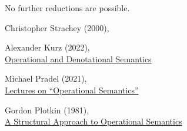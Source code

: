 \documentclass{article}
\begin{document}
No further reductions are possible.
\plush{}


Christopher Strachey (2000),\\

Alexander Kurz (2022),\\
\href{https://hackmd.io/@alexhkurz/Hkf6BTL6P}{Operational and Denotational Semantics}

Michael Pradel (2021),\\
\href{https://www.youtube.com/watch?v=jsBHd3-04oA}{Lectures on ``Operational Semantics''}

Gordon Plotkin (1981),\\
\href{https://web.eecs.umich.edu/~weimerw/2006-615/reading/plotkin81structural.pdf}{A Structural Approach to Operational Semantics}
\end{document}
